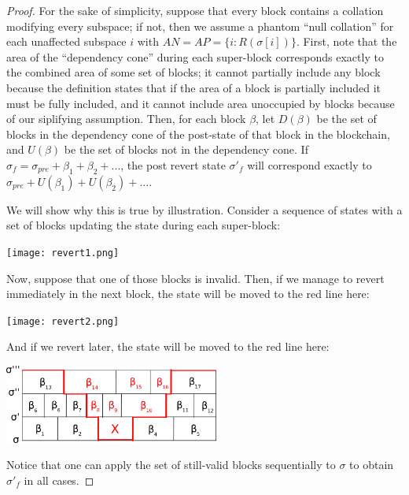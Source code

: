 \documentclass[11pt,a4paper]{article}
\theoremstyle{plain}
\theoremstyle{definition}
\theoremstyle{remark}
\begin{document}
\begin{proof}
For the sake of simplicity, suppose that every block contains a collation modifying every subspace; if not, then we assume a phantom ``null collation'' for each unaffected subspace $i$ with $AN = AP = \{i: R(\sigma[i])\}$. First, note that the area of the ``dependency cone'' during each super-block corresponds exactly to the combined area of some set of blocks; it cannot partially include any block because the definition states that if the area of a block is partially included it must be fully included, and it cannot include area unoccupied by blocks because of our siplifying assumption. Then, for each block $\beta$, let $D(\beta)$ be the set of blocks in the dependency cone of the post-state of that block in the blockchain, and $U(\beta)$ be the set of blocks not in the dependency cone. If $\sigma_f = \sigma_{pre} + \beta_1 + \beta_2 + ...$, the post revert state $\sigma'_f$ will correspond exactly to $\sigma_{pre} + U(\beta_1) + U(\beta_2) + ...$. 

We will show why this is true by illustration. Consider a sequence of states with a set of blocks updating the state during each super-block:

\begin{center}
\texttt{[image: revert1.png]}
\end{center}

Now, suppose that one of those blocks is invalid. Then, if we manage to revert immediately in the next block, the state will be moved to the red line here:

\begin{center}
\texttt{[image: revert2.png]}
\end{center}

And if we revert later, the state will be moved to the red line here:

\begin{center}
\includegraphics[width=200pt]{revert3.png}
\end{center}

Notice that one can apply the set of still-valid blocks sequentially to $\sigma$ to obtain $\sigma'_f$ in all cases.
\end{proof}
\end{document}

